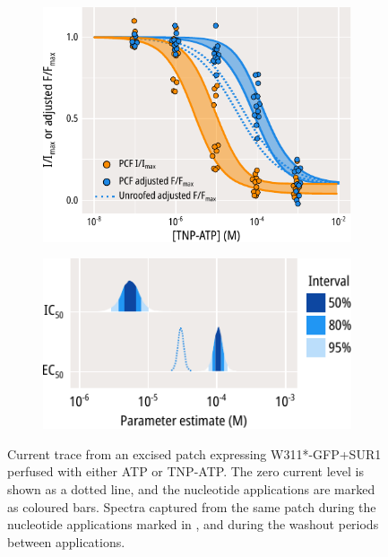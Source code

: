 \begin{figure}[h]
\begin{subfigure}[t]{0.4\textwidth}
	\end{subfigure}
	\vfill
	\begin{subfigure}[t]{0.45\textwidth}
		\caption{}\label{ch3fig:pcf_1}
		\centering
		\includegraphics[width=\textwidth]{pcf_1.pdf}
	\end{subfigure}
	\hfill
	\begin{subfigure}[t]{0.45\textwidth}
		\caption{}\label{ch3fig:ec50_fits_4}
		\centering
		\includegraphics[width=\textwidth]{ec50_fits_4.pdf}
	\end{subfigure}
	\caption[ANAP is not quenched by ATP]{
	 Current trace from an excised patch expressing W311*-GFP+SUR1 perfused with either ATP or TNP-ATP.
	The zero current level is shown as a dotted line, and the nucleotide applications are marked as coloured bars.
	 Spectra captured from the same patch during the nucleotide applications marked in , and during the washout periods between applications.
}
\end{figure}
